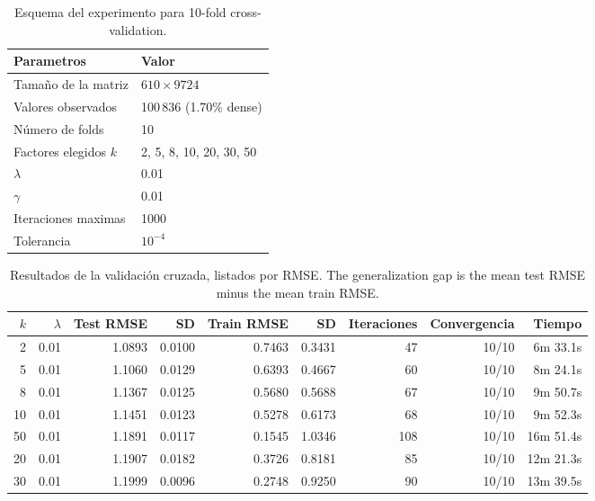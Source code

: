 	\begin{table}[ht]
		\centering
		\caption{Esquema del experimento para 10-fold cross-validation.}
		\label{tab:setup}
		\begin{tabular}{@{}ll@{}}
			\toprule
			Parametros & Valor \\
			\midrule
			Tamaño de la matriz & $610 \times 9724$ \\
			Valores observados & 100\,836 (1.70\% dense) \\
			Número de folds & 10 \\
			Factores elegidos $k$ & 2, 5, 8, 10, 20, 30, 50 \\
			$\lambda$ & 0.01 \\
			$\gamma$ & 0.01 \\
			Iteraciones maximas& 1000 \\
			Tolerancia & $10^{-4}$ \\
			\bottomrule
		\end{tabular}
	\end{table}
	
	\begin{table}[ht]
		\centering
		\caption{Resultados de la validación cruzada, listados por RMSE.
			The generalization gap is the mean test RMSE minus the mean train RMSE.}
		\label{tab:summary}
		\begin{tabular}{@{}rrrrrrrrr@{}}
			\toprule
			$k$ & $\lambda$ & Test RMSE & SD & Train RMSE & SD& Iteraciones & Convergencia & Tiempo \\
			\midrule
			2 & 0.01 & 1.0893 & 0.0100 & 0.7463 & 0.3431 &  47 & 10/10 & 6m 33.1s  \\
			5 & 0.01 & 1.1060 & 0.0129 & 0.6393 & 0.4667 &  60 & 10/10 & 8m 24.1s  \\
			8 & 0.01 & 1.1367 & 0.0125 & 0.5680 & 0.5688 &  67 & 10/10 & 9m 50.7s  \\
			10 & 0.01 & 1.1451 & 0.0123 & 0.5278 & 0.6173 &  68 & 10/10 & 9m 52.3s  \\
			50 & 0.01 & 1.1891 & 0.0117 & 0.1545 & 1.0346 & 108 & 10/10 & 16m 51.4s \\
			20 & 0.01 & 1.1907 & 0.0182 & 0.3726 & 0.8181 &  85 & 10/10 & 12m 21.3s \\
			30 & 0.01 & 1.1999 & 0.0096 & 0.2748 & 0.9250 &  90 & 10/10 & 13m 39.5s \\
			\bottomrule
		\end{tabular}
	\end{table}
	
